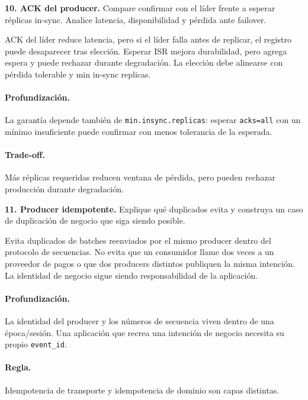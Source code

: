 \documentclass[variant=guiaresuelta,cover=institutional,mode=screen]{ua-engineering-v6-article}
\begin{document}
\begin{uaexercise}
\textbf{10. ACK del producer.} Compare confirmar con el líder frente a esperar réplicas in-sync. Analice latencia, disponibilidad y pérdida ante failover.
\end{uaexercise}
\begin{uaanswer}
ACK del líder reduce latencia, pero si el líder falla antes de replicar, el registro puede desaparecer tras elección. Esperar ISR mejora durabilidad, pero agrega espera y puede rechazar durante degradación. La elección debe alinearse con pérdida tolerable y min in-sync replicas.

\paragraph{Profundización.} La garantía depende también de \texttt{min.insync.replicas}: esperar \texttt{acks=all} con un mínimo insuficiente puede confirmar con menos tolerancia de la esperada.\paragraph{Trade-off.} Más réplicas requeridas reducen ventana de pérdida, pero pueden rechazar producción durante degradación.
\end{uaanswer}
\begin{uaexercise}
\textbf{11. Producer idempotente.} Explique qué duplicados evita y construya un caso de duplicación de negocio que siga siendo posible.
\end{uaexercise}
\begin{uaanswer}
Evita duplicados de batches reenviados por el mismo producer dentro del protocolo de secuencias. No evita que un consumidor llame dos veces a un proveedor de pagos o que dos producers distintos publiquen la misma intención. La identidad de negocio sigue siendo responsabilidad de la aplicación.

\paragraph{Profundización.} La identidad del producer y los números de secuencia viven dentro de una época/sesión. Una aplicación que recrea una intención de negocio necesita su propio \texttt{event\_id}.\paragraph{Regla.} Idempotencia de transporte y idempotencia de dominio son capas distintas.
\end{uaanswer}
\end{document}

